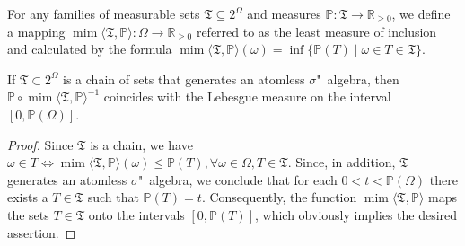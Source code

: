\begin{definition}
	For any families of measurable sets $\mathfrak{T} \subseteq 2^\Omega$ and measures $\mathbb{P} : \mathfrak{T} \rightarrow \mathbb{R}_{\ge 0}$, we define a mapping $\operatorname{mim}\langle\mathfrak{T}, \mathbb{P}\rangle : \Omega \rightarrow \mathbb{R}_{\ge 0}$ referred to as the least measure of inclusion and calculated by the formula $\operatorname{mim}\langle\mathfrak{T}, \mathbb{P}\rangle(\omega) = \inf\{\mathbb{P}(T) \mid \omega \in T \in \mathfrak{T}\}$. %
\end{definition}

\begin{lemma}
	If $\mathfrak{T} \subset 2^\Omega$ is a chain of sets that generates an atomless $\sigma$"~algebra, then $\mathbb{P} \circ \operatorname{mim}\langle\mathfrak{T}, \mathbb{P}\rangle^{-1}$ coincides with the Lebesgue measure on the interval $[0, \mathbb{P}(\Omega)]$. %
\end{lemma}

\begin{proof}
	Since $\mathfrak{T}$ is a chain, we have $\omega \in T \Leftrightarrow \operatorname{mim}\langle\mathfrak{T}, \mathbb{P}\rangle(\omega) \le \mathbb{P}(T), \forall \omega \in \Omega, T \in \mathfrak{T}$. Since, in addition, $\mathfrak{T}$ generates an atomless $\sigma$"~algebra, we conclude that for each $0 < t < \mathbb{P}(\Omega)$ there exists a $T \in \mathfrak{T}$ such that $\mathbb{P}(T) = t$. Consequently, the function $\operatorname{mim}\langle\mathfrak{T}, \mathbb{P}\rangle$ maps the sets $T \in \mathfrak{T}$ onto the intervals $[0, \mathbb{P}(T)]$, which obviously implies the desired assertion. %
\end{proof}

